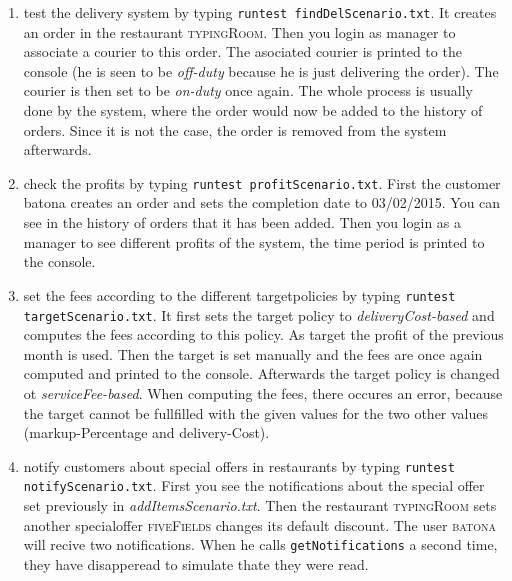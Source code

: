 \begin{enumerate}[itemsep=0mm]
	\item test the delivery system by typing \lstinline|runtest findDelScenario.txt|. It creates
		an order in the restaurant \textsc{typingRoom}. Then you login as manager to 
		associate a courier to this order. The asociated courier is printed to the console 
		(he is seen to be \textit{off-duty} because he is just delivering the order). 
		The courier is then set to be \textit{on-duty} once again. The whole process is 
		usually done by the system, where the order would now be added to the history of 
		orders. Since it is not the case, the order is removed from the system afterwards.
	\item check the profits by typing \lstinline|runtest profitScenario.txt|. First the customer
		batona creates an order and sets the completion date to \textsc{03/02/2015}. You can 
		see in the history of orders that it has been added. Then you login as a manager to 
		see different profits of the system, the time period is printed to the console.
	\item set the fees according to the different targetpolicies by typing 
		\lstinline|runtest targetScenario.txt|. It first sets the target policy to
		\textit{deliveryCost-based} and computes the fees according to this policy. As 
		target the profit of the previous month is used. Then the target is set manually and
		the fees are once again computed and printed to the console. Afterwards the 
		target policy is changed ot \textit{serviceFee-based}. When computing the fees, there
		occures an error, because the target cannot be fullfilled with the given values for 
		the two other values (markup-Percentage and delivery-Cost).
	\item notify customers about special offers in restaurants by typing
		\lstinline|runtest notifyScenario.txt|. First you see the notifications about the 
		special offer set previously in \textit{addItemsScenario.txt}. Then the restaurant
		\textsc{typingRoom} sets another specialoffer \textsc{fiveFields} changes its
		default discount. The user \textsc{batona} will recive two notifications. When he 
		calls \lstinline|getNotifications| a second time, they have disapperead to 
		simulate thate they were read.
			
	
		
\end{enumerate}

